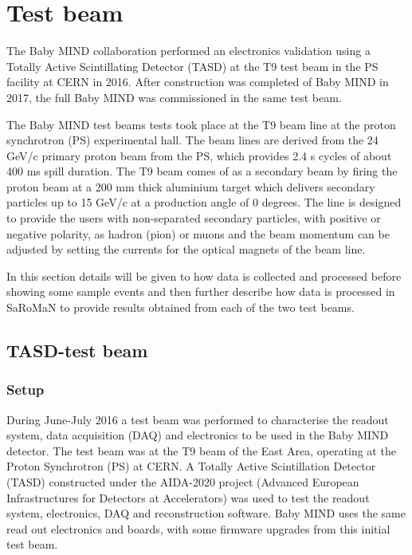 \chapter{Test beam}
\label{c:Testbeam}

The Baby MIND collaboration performed an electronics validation using a Totally Active Scintillating Detector (TASD) at the T9 test beam in the PS facility at CERN in 2016. After construction was completed of Baby MIND in 2017, the full Baby MIND was commissioned in the same test beam.

The Baby MIND test beams tests took place at the T9 beam line at the proton synchrotron (PS) experimental hall. The beam lines are derived from the 24 GeV/c primary proton beam from the PS, which provides 2.4 s cycles of about 400 ms spill duration. The T9 beam comes of as a secondary beam by firing the proton beam at a 200 mm thick aluminium target which delivers secondary particles up to 15 GeV/c at a production angle of 0 degrees. The line is designed to provide the users with non-separated secondary particles, with positive or negative polarity, as hadron (pion) or muons and the beam momentum can be adjusted by setting the currents for the optical magnets of the beam line.

In this section details will be given to how data is collected and processed before showing some sample events and then further describe how data is processed in SaRoMaN to provide results obtained from each of the two test beams.


\section{TASD-test beam}

\subsection{Setup}
During June-July 2016 a test beam was performed to characterise the readout system, data acquisition (DAQ) and electronics to be used in the Baby MIND detector. The test beam was at the T9 beam of the East Area, operating at the Proton Synchrotron (PS) at CERN. A Totally Active Scintillation Detector (TASD) constructed under the AIDA-2020 project (Advanced European Infrastructures for Detectors at Accelerators) was used to test the readout system, electronics, DAQ and reconstruction software. Baby MIND uses the same read out electronics and boards, with some firmware upgrades from this initial test beam.

